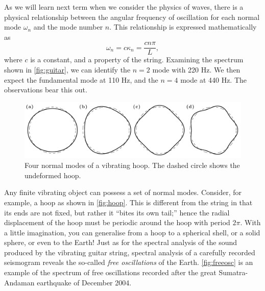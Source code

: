 \documentclass[11pt,twoside,a4paper]{article}
\begin{document}
As we will learn next term when we consider the physics of waves,
there is a physical relationship between the angular frequency of
oscillation for each normal mode $\omega_n$ and the mode number
$n$. This relationship is expressed mathematically as
\begin{equation}
  \label{eq:frequencies}
  \omega_n = c\kappa_n = \frac{cn\pi}{L},
\end{equation}
where $c$ is a constant, and a property of the string.  Examining the
spectrum shown in \autoref{fig:guitar}, we can identify the $n=2$ mode
with 220 Hz.  We then expect the fundamental mode at 110 Hz, and the
$n=4$ mode at 440 Hz.  The observations bear this out.

\begin{figure}[hb]
  \centering
  \includegraphics[width=\textwidth]{../figs/L16/HoopNormalModes}
  \caption{Four normal modes of a vibrating hoop. The dashed circle
    shows the undeformed hoop.\vspace{1cm}}
  \label{fig:hoop}
\end{figure}

Any finite vibrating object can possess a set of normal modes.
Consider, for example, a hoop as shown in \autoref{fig:hoop}.  This is
different from the string in that its ends are not fixed, but rather
it ``bites its own tail;'' hence the radial displacement of the hoop
must be periodic around the hoop with period $2\pi$.  With a little
imagination, you can generalise from a hoop to a spherical shell, or a
solid sphere, or even to the Earth!  Just as for the spectral analysis
of the sound produced by the vibrating guitar string, spectral
analysis of a carefully recorded seismogram reveals the so-called
\textit{free oscillations} of the Earth.  \autoref{fig:freeosc} is an
example of the spectrum of free oscillations recorded after the great
Sumatra-Andaman earthquake of December 2004.
\end{document}
